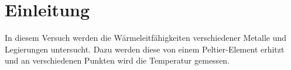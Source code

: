 
\section{Einleitung}

In diesem Versuch werden die Wärmeleitfähigkeiten verschiedener Metalle
und Legierungen untersucht. Dazu werden diese von einem Peltier-Element
erhitzt und an verschiedenen Punkten wird die Temperatur gemessen.
